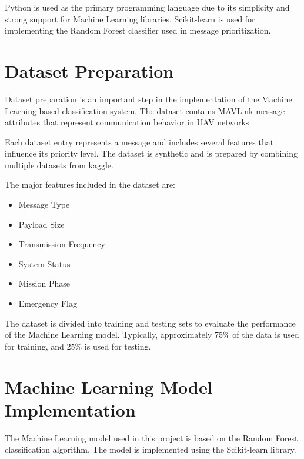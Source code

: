 Python is used as the primary programming language due to its 
simplicity and strong support for Machine Learning libraries. 
Scikit-learn is used for implementing the Random Forest classifier 
used in message prioritization.


\section{Dataset Preparation}

Dataset preparation is an important step in the implementation of 
the Machine Learning-based classification system. The dataset 
contains MAVLink message attributes that represent communication 
behavior in UAV networks.

Each dataset entry represents a message and includes several 
features that influence its priority level. The dataset is synthetic and is 
prepared by combining multiple datasets from kaggle.

The major features included in the dataset are:

\begin{itemize}

\item Message Type

\item Payload Size

\item Transmission Frequency

\item System Status

\item Mission Phase

\item Emergency Flag

\end{itemize}

The dataset is divided into training and testing sets to evaluate 
the performance of the Machine Learning model. Typically, 
approximately 75\% of the data is used for training, and 
25\% is used for testing.


\section{Machine Learning Model Implementation}

The Machine Learning model used in this project is based on the 
Random Forest classification algorithm. The model is implemented 
using the Scikit-learn library.


